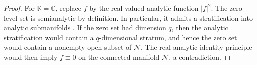 \documentclass[11pt,oneside]{amsart}
\theoremstyle{plain}
\newtheorem{lemma}[theorem]{Lemma}
\theoremstyle{definition}
\theoremstyle{remark}
\newcommand{\CC}{\mathbb{C}}
\newcommand{\KK}{\mathbb{K}}
\newcommand{\calX}{\mathcal{X}}
\newcommand{\calY}{\mathcal{Y}}
\begin{document}
\begin{proof}
For $\KK=\CC$, replace $f$ by the real-valued analytic function $|f|^2$. The zero level set is semianalytic by definition. In particular, it admits a stratification into analytic submanifolds \cite[Proposition 2.10]{bierstone1988semianalytic}. If the zero set had dimension $q$, then the analytic stratification would contain a $q$-dimensional stratum, and hence the zero set would contain a nonempty open subset of $\mathcal N$. The real-analytic identity principle would then imply $f\equiv0$ on the connected manifold $\mathcal N$, a contradiction.
\end{proof}

\end{document}
